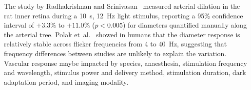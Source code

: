 The study by Radhakrishnan and Srinivasan~\cite{radhakrishnanMultiparametricOpticalCoherence2013} measured arterial dilation in the rat inner retina during a 10~s, 12~Hz light stimulus, reporting a 95\% confidence interval of $+3.3\%$ to $+11.0\%$ ($p < 0.005$) for diameters quantified manually along the arterial tree. Polak et~al.~\cite{polakInfluenceFlickerFrequency2002} showed in humans that the diameter response is relatively stable across flicker frequencies from 4 to 40~Hz, suggesting that frequency differences between studies are unlikely to explain the variation. Vascular response maybe impacted by species, anaesthesia, stimulation frequency and wavelength, stimulus power and delivery method, stimulation duration, dark adaptation period, and imaging modality. %



